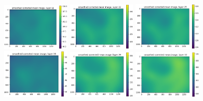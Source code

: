 \documentclass[letterpaper,11pt]{article}
\begin{document}
\begin{figure}[!ht]
\includegraphics[width=0.3\textwidth]{images/results/smoothed_corrected_mean_image_layers_vectra/smoothed_corrected_mean_image_layer_19_same_scale}
\includegraphics[width=0.3\textwidth]{images/results/smoothed_corrected_mean_image_layers_vectra/smoothed_corrected_mean_image_layer_22_same_scale}
\includegraphics[width=0.3\textwidth]{images/results/smoothed_corrected_mean_image_layers_vectra/smoothed_corrected_mean_image_layer_25_same_scale}
\includegraphics[width=0.3\textwidth]{images/results/smoothed_corrected_mean_image_layers_vectra/smoothed_corrected_mean_image_layer_26_same_scale}
\includegraphics[width=0.3\textwidth]{images/results/smoothed_corrected_mean_image_layers_vectra/smoothed_corrected_mean_image_layer_29_same_scale}
\includegraphics[width=0.3\textwidth]{images/results/smoothed_corrected_mean_image_layers_vectra/smoothed_corrected_mean_image_layer_32_same_scale}

\end{figure}
\end{document}
